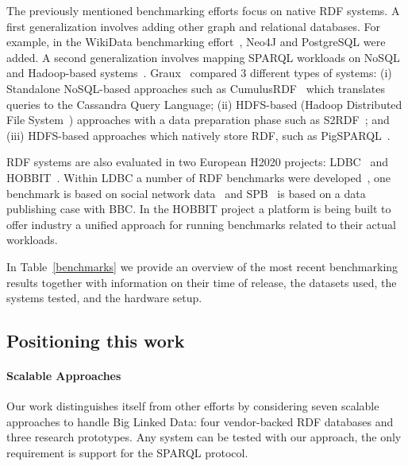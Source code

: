 The previously mentioned benchmarking efforts focus on native RDF systems. A first generalization involves adding other graph and relational databases. For example, in the WikiData benchmarking effort~\cite{hernandez2016querying}, Neo4J and PostgreSQL were added. 
A second generalization involves mapping SPARQL workloads on NoSQL and Hadoop-based systems~\cite{cudre2013nosql, graux2016multi, Schatzle:2016:SRQ:2977797.2977806}. Graux~\cite{graux2016multi} compared 3 different types of systems: (i) Standalone NoSQL-based approaches such as CumulusRDF~\cite{ladwig2011cumulusrdf} which translates queries to the Cassandra Query Language; (ii) HDFS-based (Hadoop Distributed File System~\cite{ghemawat2003google}) approaches with a data preparation phase such as S2RDF~\cite{Schatzle:2016:SRQ:2977797.2977806}; and (iii) HDFS-based approaches which natively store RDF, such as PigSPARQL~\cite{schatzle2011pigsparql}. 

RDF systems are also evaluated in two European H2020 projects: LDBC~\cite{LDBC} and 
HOBBIT~\cite{HOBBIT}. Within LDBC a number of RDF benchmarks were developed~\cite{Boncz:2013:LBG:2513591.2527070}, one benchmark is based on social network data~\cite{erling2015ldbc} and SPB~\cite{kotsevbenchmarking} is based on a data publishing case with BBC. 
In the HOBBIT project a platform is being built to offer industry a unified approach for running benchmarks related to their actual workloads.

In Table~\ref{benchmarks} we provide an overview of the most recent benchmarking results together with information on their time of release, the datasets used,
the systems tested, and the hardware setup.

\subsection{Positioning this work}


\paragraph{Scalable Approaches}
Our work distinguishes itself from other efforts by considering seven scalable approaches to handle Big Linked Data: four vendor-backed RDF databases and three research prototypes. Any system can be tested with our approach, the only requirement is support for the SPARQL protocol.

